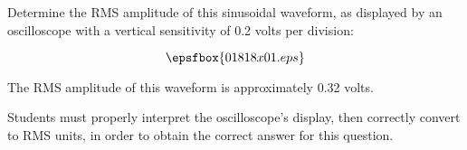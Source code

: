 

Determine the RMS amplitude of this sinusoidal waveform, as displayed by an oscilloscope with a vertical sensitivity of 0.2 volts per division:

$$\epsfbox{01818x01.eps}$$







The RMS amplitude of this waveform is approximately 0.32 volts.







Students must properly interpret the oscilloscope's display, then correctly convert to RMS units, in order to obtain the correct answer for this question.




